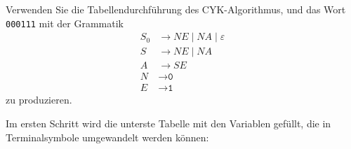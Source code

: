 Verwenden Sie die Tabellendurchführung des CYK-Algorithmus, und
das Wort \texttt{000111} mit der Grammatik
\begin{align*}
S_0& \to NE \mid NA \mid \varepsilon \\
S  & \to NE \mid NA \\
A  &\to SE \\
N&\to \texttt{0} \\
E&\to \texttt{1} 
\end{align*}
zu produzieren.

\begin{loesung}
\def\h{1.0}
\def\punkt#1#2{({(#1)*\h},{(#2)*\h})}
\def\tabelle{
	\draw \punkt{0}{0} -- \punkt{6}{0};
	\foreach \x in {1,...,6}{
		\draw \punkt{0}{\x} -- \punkt{7-\x}{\x};
	}
	\draw \punkt{0}{0} -- \punkt{0}{6};
	\foreach \x in {1,...,6}{
		\draw \punkt{\x}{0} -- \punkt{\x}{7-\x};
	}
	\node at \punkt{0.5}{-0.5} {\texttt{0}};
	\node at \punkt{1.5}{-0.5} {\texttt{0}};
	\node at \punkt{2.5}{-0.5} {\texttt{0}};
	\node at \punkt{3.5}{-0.5} {\texttt{1}};
	\node at \punkt{4.5}{-0.5} {\texttt{1}};
	\node at \punkt{5.5}{-0.5} {\texttt{1}};
	\draw[decorate,decoration={calligraphic brace},thick]
		\punkt{6}{-1} -- \punkt{0}{-1};
	\node at \punkt{3}{-1.5} {$w$};
}
\def\terminal#1#2#3{
	\draw[->,color=red,line width=1.4pt,shorten >= 0.3cm,shorten <= 0.3cm]
		\punkt{#1-0.5}{#2-0.5} -- ++\punkt{0}{-1};
	\node at \punkt{#1-0.5}{#2-0.5}{#3};
}
\def\zeichen#1#2#3#4{
	\draw[->,color=red,line width=1.4pt,shorten >= 0.2cm,shorten <= 0.2cm]
		\punkt{#1-0.5}{#2-0.5} -- ++\punkt{0}{-#4};
	\draw[->,color=red,line width=1.4pt,shorten >= 0.28cm,shorten <= 0.28cm]
		\punkt{#1-0.5}{#2-0.5} -- ++\punkt{#2-#4}{#4-#2};
	\node at \punkt{#1-0.5}{#2-0.5}{#3};
}
\def\keinzeichen#1#2{
	\fill[color=gray!40] \punkt{#1}{#2}
		-- ++\punkt{-1}{0}
		-- ++\punkt{0}{-1}
		-- ++\punkt{1}{0} -- cycle;
}
\def\lineone{
	\terminal{1}{1}{$N$}
	\terminal{2}{1}{$N$}
	\terminal{3}{1}{$N$}
	\terminal{4}{1}{$E$}
	\terminal{5}{1}{$E$}
	\terminal{6}{1}{$E$}
}
\def\linetwo{
	\keinzeichen{1}{2}
	\keinzeichen{2}{2}
	\zeichen{3}{2}{$S_0,S$}{1}
	\keinzeichen{4}{2}
	\keinzeichen{5}{2}
}
\def\linethree{
	\keinzeichen{1}{3}
	\keinzeichen{2}{3}
	\zeichen{3}{3}{$A$}{1}
	\keinzeichen{4}{3}
}
\def\linefour{
	\keinzeichen{1}{4}
	\zeichen{2}{4}{$S_0,S$}{3}
	\keinzeichen{3}{4}
}
\def\linefive{
	\keinzeichen{1}{5}
	\zeichen{2}{5}{$A$}{1}
}
\def\linesix{
	\zeichen{1}{6}{$S_0,S$}{5}
}
Im ersten Schritt wird die unterste Tabelle mit den Variablen
gefüllt, die in Terminalsymbole umgewandelt werden können:
\begin{center}

\end{center}
\end{loesung}
